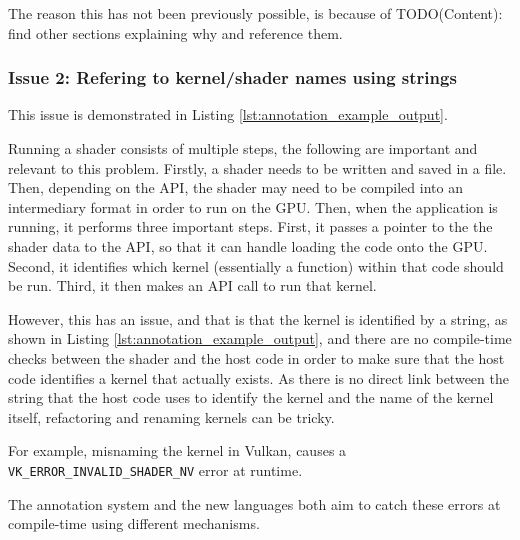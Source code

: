 \documentclass[a4paper,12pt,twoside,openright]{report}
\begin{document}
The reason this has not been previously possible, is because of TODO(Content): find
other sections explaining why and reference them.

\subsubsection{Issue 2: Refering to kernel/shader names using strings}

This issue is demonstrated in Listing \ref{lst:annotation_example_output}.

Running a shader consists of multiple steps, the following are important and
relevant to this problem. Firstly, a shader needs to be written and saved in a
file. Then, depending on the API, the shader may need to be compiled into an
intermediary format in order to run on the GPU. Then, when the application is
running, it performs three important steps. First, it passes a pointer to the
the shader data to the API, so that it can handle loading the code onto the
GPU. Second, it identifies which kernel (essentially a function) within that
code should be run. Third, it then makes an API call to run that kernel.

However, this has an issue, and that is that the kernel is identified by a
string, as shown in Listing \ref{lst:annotation_example_output}, and there are
no compile-time checks between the shader and the host code in order to make
sure that the host code identifies a kernel that actually exists. As there is
no direct link between the string that the host code uses to identify the
kernel and the name of the kernel itself, refactoring and renaming kernels can
be tricky.

For example, misnaming the kernel in Vulkan, causes a
\texttt{VK\_ERROR\_INVALID\_SHADER\_NV} error at runtime.



The annotation system and the new languages both aim to catch these errors at
compile-time using different mechanisms.


\end{document}
